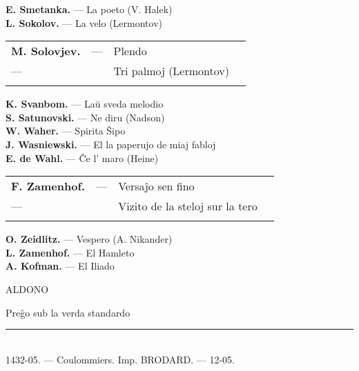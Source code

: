 {{\bf E. Smetanka.}  ---  La poeto (V. Halek) \dotfill  \pageref{poeto}\\
{\bf L. Sokolov.}  ---  La velo (Lermontov) \dotfill  \pageref{velo}\\
\vspace*{-21pt}
\begin{longtabu} to
\bf M. Solovjev. & --- & Plendo \dotfill & \pageref{plendo}\\
\hfil--- & & Tri palmoj (Lermontov) \dotfill & \pageref{palmoj}\\
\vspace*{-40pt}
\end{longtabu}
{\bf K. Svanbom.}  ---  Laŭ sveda melodio \dotfill  \pageref{sveda}\\
{\bf S. Satunovski.}  ---  Ne diru (Nadson) \dotfill  \pageref{nediru}\\
{\bf W. Waher.}  ---  Spirita Ŝipo \dotfill  \pageref{spirita}\\
{\bf J. Wasniewski.}  --- El la paperujo de miaj fabloj \dotfill  \pageref{paperujo}\\
{\bf E. de Wahl.}  ---  Ĉe l' maro (Heine) \dotfill  \pageref{maro}\\
\vspace*{-21pt}
\begin{longtabu} to
\bf F. Zamenhof. & --- & Versaĵo sen fino \dotfill \pageref{senfino}\\
\hfil--- & & Vizito de la steloj sur la tero \dotfill \pageref{vizito}\\
\vspace*{-40pt}
\end{longtabu}
{\bf O. Zeidlitz.}  ---  Vespero (A. Nikander) \dotfill  \pageref{vespero}\\
{\bf L. Zamenhof.}  ---  El Hamleto \dotfill  \pageref{hamleto}\\
{\bf A. Kofman.} --- El Iliado \dotfill  \pageref{iliado}

{\centering \sansfont ALDONO\par}

Preĝo sub la verda standardo \dotfill \pageref{standardo}

} %

\vspace*{\fill}

\begin{center}
\rule{13mm}{0.4pt}\\
\footnotesize 1432-05. --- Coulommiers. Imp.  BRODARD. --- 12-05.
\end{center}
\cleardoublepage
